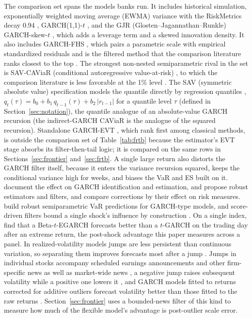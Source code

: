\documentclass[11pt]{article}
\theoremstyle{remark}
\begin{document}
The comparison set spans the models banks run. It includes historical simulation, exponentially weighted moving average (EWMA) variance with the RiskMetrics decay $0.94$ \citep{riskmetrics1996}, GARCH(1,1)-$t$ \citep{bollerslev1986, bollerslev1987}, and the GJR (Glosten--Jagannathan--Runkle) GARCH-skew-$t$ \citep{glosten1993, hansen1994ARCD}, which adds a leverage term and a skewed innovation density. It also includes GARCH-FHS \citep{baroneadesi1999fhs, hullwhite1998}, which pairs a parametric scale with empirical standardized residuals and is the filtered method that the comparison literature ranks closest to the top \citep{kuester2006, nietoruiz2016}. The strongest non-nested semiparametric rival in the set is SAV-CAViaR (conditional autoregressive value-at-risk) \citep{engle2004caviar}, to which the comparison literature is less favorable at the 1\% level \citep{kuester2006}.
The SAV (symmetric absolute value) specification models the quantile
directly by regression quantiles \citep{koenker1978},
$q_t(\tau) = b_0 + b_1\, q_{t-1}(\tau) + b_2\,|r_{t-1}|$ for a quantile level $\tau$ (defined in Section~\ref{sec:notation}), the
quantile analogue of an absolute-value GARCH recursion (the indirect-GARCH CAViaR is the analogue of the squared recursion).
Standalone GARCH-EVT \citep{mcneilfrey2000}, which \citet{kuester2006} rank first among classical methods, is outside the comparison set of Table~\ref{tab:frtb} because the estimator's EVT stage absorbs its filter-then-tail logic; it is compared on the same rows in Sections~\ref{sec:frontier} and~\ref{sec:frtb}.
A single large return also distorts the GARCH filter itself, because it enters the variance recursion squared, keeps the conditional variance high for weeks, and biases the VaR and ES built on it. \citet{carnero2007outliers} document the effect on GARCH identification and estimation, \citet{muler2008robust} and \citet{boudt2013robust} propose robust estimators and filters, and \citet{grane2014outliers} compare corrections by their effect on risk measures. \citet{mancinitrojani2011} build robust semiparametric VaR predictions for GARCH-type models, and score-driven filters bound a single shock's influence by construction \citep{harvey2013dynamic}. On a single index, \citet{blazsek2018extreme} find that a Beta-$t$-EGARCH forecasts better than a $t$-GARCH on the trading day after an extreme return, the post-shock advantage this paper measures across a panel. In realized-volatility models jumps are less persistent than continuous variation, so separating them improves forecasts most after a jump \citep{andersen2007roughing, corsi2010threshold}. Jumps in individual stocks accompany scheduled earnings announcements and other firm-specific news as well as market-wide news \citep{leemykland2008, lee2012jumps}, a negative jump raises subsequent volatility while a positive one lowers it \citep{pattonsheppard2015}, and GARCH models fitted to returns corrected for additive outliers forecast volatility better than those fitted to the raw returns \citep{fransesghijsels1999}. Section~\ref{sec:frontier} uses a bounded-news filter of this kind to measure how much of the flexible model's advantage is post-outlier scale error.
\end{document}
